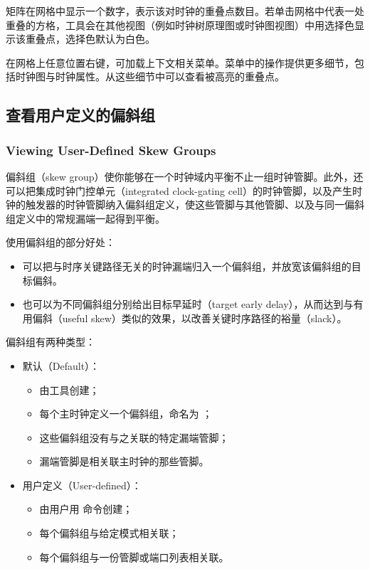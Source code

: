 矩阵在网格中显示一个数字，表示该对时钟的重叠点数目。若单击网格中代表一处重叠的方格，工具会在其他视图（例如时钟树原理图或时钟图视图）中用选择色显示该重叠点，选择色默认为白色。

在网格上任意位置右键，可加载上下文相关菜单。菜单中的操作提供更多细节，包括时钟图与时钟属性。从这些细节中可以查看被高亮的重叠点。

\subsection{查看用户定义的偏斜组}
\subsubsection*{Viewing User-Defined Skew Groups}

偏斜组（skew group）使你能够在一个时钟域内平衡不止一组时钟管脚。此外，还可以把集成时钟门控单元（integrated clock-gating cell）的时钟管脚，以及产生时钟的触发器的时钟管脚纳入偏斜组定义，使这些管脚与其他管脚、以及与同一偏斜组定义中的常规漏端一起得到平衡。

使用偏斜组的部分好处：
\begin{itemize}
  \item 可以把与时序关键路径无关的时钟漏端归入一个偏斜组，并放宽该偏斜组的目标偏斜。
  \item 也可以为不同偏斜组分别给出目标早延时（target early delay），从而达到与有用偏斜（useful skew）类似的效果，以改善关键时序路径的裕量（slack）。
\end{itemize}

偏斜组有两种类型：
\begin{itemize}
  \item 默认（Default）：
  \begin{itemize}
    \item 由工具创建；
    \item 每个主时钟定义一个偏斜组，命名为 ；
    \item 这些偏斜组没有与之关联的特定漏端管脚；
    \item 漏端管脚是相关联主时钟的那些管脚。
  \end{itemize}
  \item 用户定义（User-defined）：
  \begin{itemize}
    \item 由用户用  命令创建；
    \item 每个偏斜组与给定模式相关联；
    \item 每个偏斜组与一份管脚或端口列表相关联。
  \end{itemize}
\end{itemize}

